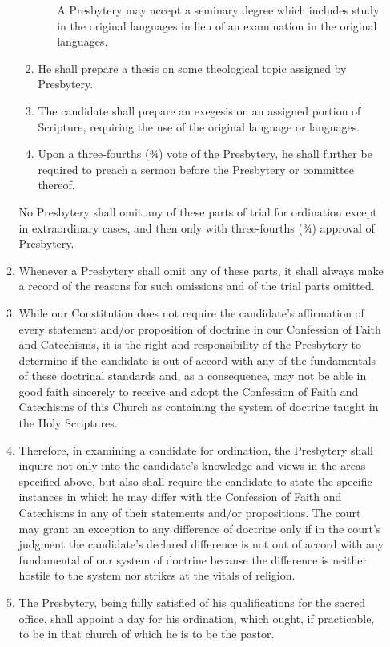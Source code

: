 \documentclass[
]{book}
\begin{document}
\begin{enumerate}
\begin{enumerate}
\begin{enumerate}
\begin{enumerate}
        A Presbytery may accept a seminary degree which includes study in the original languages in lieu of an examination in the original languages.
      \end{enumerate}
    \item
      He shall prepare a thesis on some theological topic assigned by Presbytery.
    \item
      The candidate shall prepare an exegesis on an assigned portion of Scripture, requiring the use of the original language or languages.
    \item
      Upon a three-fourths (¾) vote of the Presbytery, he shall further be required to preach a sermon before the Presbytery or committee thereof.
    \end{enumerate}

    No Presbytery shall omit any of these parts of trial for ordination except in extraordinary cases, and then only with three-fourths (¾) approval of Presbytery.
  \item
    Whenever a Presbytery shall omit any of these parts, it shall always make a record of the reasons for such omissions and of the trial parts omitted.
  \item
    \protect\hypertarget{23.4.e}{\href{}{}}While our Constitution does not require the candidate's affirmation of every statement and/or proposition of doctrine in our Confession of Faith and Catechisms, it is the right and responsibility of the Presbytery to determine if the candidate is out of accord with any of the fundamentals of these doctrinal standards and, as a consequence, may not be able in good faith sincerely to receive and adopt the Confession of Faith and Catechisms of this Church as containing the system of doctrine taught in the Holy Scriptures.
  \item
    \protect\hypertarget{23.4.f}{\href{}{}}Therefore, in examining a candidate for ordination, the Presbytery shall inquire not only into the candidate's knowledge and views in the areas specified above, but also shall require the candidate to state the specific instances in which he may differ with the Confession of Faith and Catechisms in any of their statements and/or propositions. The court may grant an exception to any difference of doctrine only if in the court's judgment the candidate's declared difference is not out of accord with any fundamental of our system of doctrine because the difference is neither hostile to the system nor strikes at the vitals of religion.
  \item
    The Presbytery, being fully satisfied of his qualifications for the sacred office, shall appoint a day for his ordination, which ought, if practicable, to be in that church of which he is to be the pastor.

\end{enumerate}
\end{enumerate}
\end{document}
